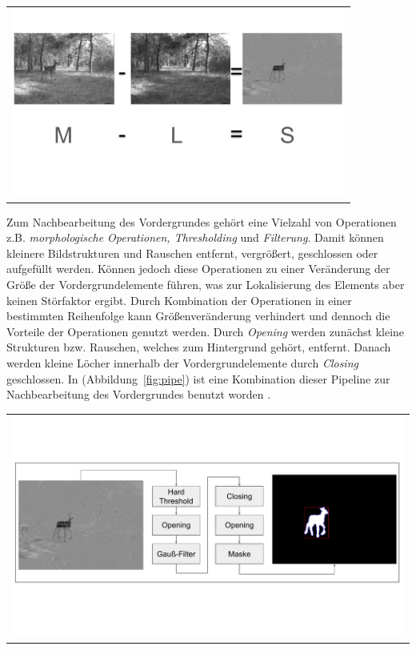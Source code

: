 \begin{center}
\begin{tabular}{c}
\includegraphics[trim={0, 4cm, 0 ,5cm},clip=ture,width=11cm]{img/Segmentierung/foreground-image}
\end{tabular}
\label{fig:foreground}
\end{center}
\noindent Zum Nachbearbeitung des Vordergrundes gehört eine Vielzahl von Operationen 
z.B. \textit{morphologische Operationen, Thresholding} und \textit{Filterung}.
Damit können kleinere Bildstrukturen und Rauschen entfernt, vergrößert, geschlossen oder aufgefüllt werden. Können jedoch diese Operationen zu einer Veränderung der Größe der Vordergrundelemente führen, was zur Lokalisierung des Elements aber keinen Störfaktor ergibt. Durch Kombination der Operationen in einer bestimmten Reihenfolge kann Größenveränderung verhindert und dennoch die Vorteile der Operationen genutzt werden. Durch \textit{Opening} werden zunächst kleine Strukturen bzw. Rauschen, welches zum Hintergrund gehört, entfernt. Danach werden kleine Löcher innerhalb der Vordergrundelemente durch \textit{Closing} geschlossen. In (Abbildung~\ref{fig:pipe}) ist eine Kombination dieser  Pipeline zur Nachbearbeitung des Vordergrundes benutzt worden \cite{Giraldoarticle}.
\begin{center}
\begin{tabular}{c}
\includegraphics[trim={0 3cm 0cm 3cm},clip=true,width=13cm]{img/Segmentierung/pipe.pdf}
\end{tabular}
\label{fig:pipe}
\end{center}
